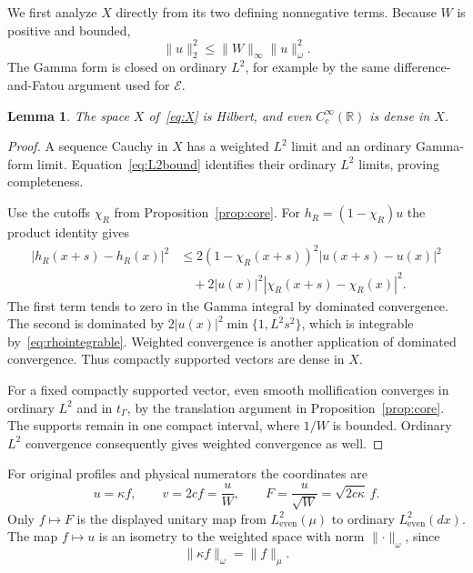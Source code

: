 \documentclass[11pt,a4paper]{article}
\numberwithin{equation}{section}
\newtheorem{lemma}[theorem]{Lemma}
\theoremstyle{remark}
\newcommand{\R}{\mathbb R}
\newcommand{\E}{\mathcal E}
\newcommand{\He}{L^2_{\mathrm{even}}(\mu)}
\newcommand{\Le}{L^2_{\mathrm{even}}(dx)}
\newcommand{\tg}{t_{\Gamma}}
\newcommand{\norm}[1]{\lVert #1\rVert}
\begin{document}
We first analyze $X$ directly from its two defining nonnegative terms. Because $W$ is positive and bounded,
\begin{equation}\label{eq:L2bound}
 \norm{u}_2^2\le\norm{W}_\infty\norm{u}_\omega^2.
\end{equation}
The Gamma form is closed on ordinary $L^2$, for example by the same difference-and-Fatou argument used for $\E$.

\begin{lemma}\label{lem:Xcore}
The space $X$ of~\eqref{eq:X} is Hilbert, and even $C_c^\infty(\R)$ is dense in $X$.
\end{lemma}
\begin{proof}
A sequence Cauchy in $X$ has a weighted $L^2$ limit and an ordinary Gamma-form limit. Equation~\eqref{eq:L2bound} identifies their ordinary $L^2$ limits, proving completeness.

Use the cutoffs $\chi_R$ from Proposition~\ref{prop:core}. For $h_R=(1-\chi_R)u$ the product identity gives
\begin{align*}
 |h_R(x+s)-h_R(x)|^2
 &\le2(1-\chi_R(x+s))^2|u(x+s)-u(x)|^2\\
 &\quad+2|u(x)|^2|\chi_R(x+s)-\chi_R(x)|^2.
\end{align*}
The first term tends to zero in the Gamma integral by dominated convergence. The second is dominated by
$2|u(x)|^2\min\{1,L^2s^2\}$, which is integrable by~\eqref{eq:rhointegrable}. Weighted convergence is another application of dominated convergence. Thus compactly supported vectors are dense in $X$.

For a fixed compactly supported vector, even smooth mollification converges in ordinary $L^2$ and in $\tg$, by the translation argument in Proposition~\ref{prop:core}. The supports remain in one compact interval, where $1/W$ is bounded. Ordinary $L^2$ convergence consequently gives weighted convergence as well.
\end{proof}

For original profiles and physical numerators the coordinates are
\begin{equation}\label{eq:coordinates}
 u=\kappa f,\qquad v=2cf=\frac uW,\qquad
 F=\frac u{\sqrt W}=\sqrt{2c\kappa}\,f.
\end{equation}
Only $f\mapsto F$ is the displayed unitary map from $\He$ to ordinary $\Le$. The map $f\mapsto u$ is an isometry to the weighted space with norm $\norm{\cdot}_\omega$, since
\begin{equation}\label{eq:weightedidentity}
 \norm{\kappa f}_\omega=\norm{f}_\mu.
\end{equation}
\end{document}

